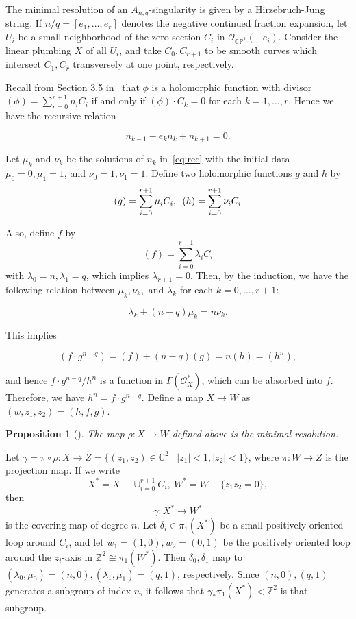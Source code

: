 \documentclass[10pt,a4paper,reqno]{amsart}
\newtheorem{prop}[thm]{Proposition}
\theoremstyle{definition}
\numberwithin{equation}{section}
\numberwithin{figure}{section}
\newcommand{\Z}{\mathbb{Z}}
\newcommand{\C}{\mathbb{C}}
\newcommand{\CP}{\mathbb{CP}}
\newcommand{\arrowr}{\rightarrow}
\begin{document}
The minimal resolution of an $A_{n,q}$-singularity is given by a Hirzebruch-Jung string.
If $n/q=\left[e_1,\dots,e_r\right]$ denotes the negative continued fraction expansion, 
let $U_i$ be a small neighborhood of the zero section $C_i$ in $\mathcal{O}_{\CP^1}(-e_i)$.
Consider the linear plumbing $X$ of all $U_i$, 
and take $C_0, C_{r+1}$ to be smooth curves which intersect $C_1, C_r$ transversely at one point, respectively.

Recall from Section 3.5 in~\cite{BHPV} that $\phi$ is a holomorphic function with divisor $(\phi)=\sum_{r=0}^{r+1}n_i C_i$ if and only if
$(\phi)\cdot C_k=0$ for each $k=1,\dots,r$. Hence we have the recursive relation

\begin{equation}\label{eq:rec}
n_{k-1}-e_k n_k +n_{k+1}=0.
\end{equation} 

Let $\mu_k$ and $\nu_k$ be the solutions of $n_k$ in~\eqref{eq:rec} with the initial data $\mu_0=0,\mu_1=1$, and $\nu_0=1,\nu_1=1$. 
Define two holomorphic functions $g$ and $h$ by 
\begin{align}\label{eq:holo}
(g)=\sum_{i=0}^{r+1}\mu_i C_i, \hskip 0.5em (h)=\sum_{i=0}^{r+1}\nu_i C_i
\end{align}

Also, define $f$ by
\[(f)=\sum_{i=0}^{r+1}\lambda_i C_i\]
with $\lambda_{0}=n, \lambda_1=q$, which implies $\lambda_{r+1}=0$.
Then, by the induction, we have the following relation between $\mu_k, \nu_k,$ and $\lambda_k$ for each $k=0,\dots, r+1$:

\begin{equation}
\lambda_k +(n-q)\mu_k=n\nu_k.
\end{equation}

This implies

\begin{equation}
(f\cdot g^{n-q})=(f)+(n-q)(g)=n(h)=(h^n),
\end{equation}

and hence $f\cdot g^{n-q}/h^n$ is a function in $\Gamma(\mathcal{O}_X^*)$, which can be absorbed into $f$.
Therefore, we have $h^n=f\cdot g^{n-q}$.
Define a map $X \arrowr W$ as $(w,z_1,z_2)=(h,f,g)$.

\begin{prop}[\cite{BHPV}]
The map $\rho:X\arrowr W$ defined above is the minimal resolution.
\end{prop}

Let $\gamma=\pi\circ \rho: X \arrowr Z=\{(z_1,z_2)\in \C^2 \mid |z_1|<1, |z_2|<1\}$, where $\pi:W\arrowr Z$ is the projection map.
If we write \[X^*=X-\cup_{i=0}^{r+1}C_i, ~W^*= W-\{z_1z_2=0\},\]
then \[\gamma: X^*\arrowr W^*\] is the covering map of degree $n$.
Let $\delta_i\in \pi_1(X^*)$ be a small positively oriented loop around $C_i$,
and let $w_1=(1,0), w_2=(0,1)$ be the positively oriented loop around the $z_i$-axis in $\Z^2 \cong \pi_1(W^*)$.
Then $\delta_0,\delta_1$ map to $(\lambda_0,\mu_0)=(n,0), (\lambda_1,\mu_1)=(q,1)$, respectively.
Since $(n,0),(q,1)$ generates a subgroup of index $n$, it follows that $\gamma_* \pi_1 (X^*)<\Z^2$ is that subgroup.
\end{document}

